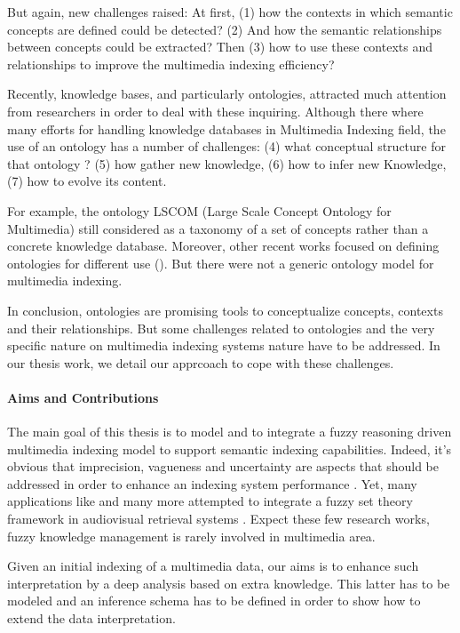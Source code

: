 	But again, new challenges raised: At first, (1) how the contexts in which semantic concepts are defined could be detected? (2) And how the semantic relationships between concepts could be extracted? Then (3) how to use these contexts and relationships to improve the multimedia indexing efficiency? 
	
	Recently, knowledge bases, and particularly ontologies, attracted much attention from researchers in order to deal with these inquiring. Although there where many efforts for handling knowledge databases in Multimedia Indexing field, the use of an ontology has a number of challenges: (4) what conceptual structure for that ontology ? (5) how gather new knowledge, (6) how to infer new Knowledge, (7) how to evolve its content.
	
	For example, the ontology LSCOM \cite{phd::Naphade2006} (Large Scale Concept Ontology for Multimedia) still considered as a taxonomy of a set of concepts rather than a concrete knowledge database. Moreover, other recent works focused on defining ontologies for different use  (\cite{phd::Karkaletsis2005,phd::Li2007, Zhai2008, phd::Mitschick2010a, phd::Kumar2012}). But there were not a generic ontology model for multimedia indexing.
	
	In conclusion, ontologies are promising tools to conceptualize concepts, contexts and their relationships. But some challenges related to ontologies and the very specific nature on multimedia indexing systems nature have to be addressed. In our thesis work, we detail our apprcoach to cope with these challenges.
	
	\paragraph{Aims and Contributions}
	The main goal of this thesis is to model and to integrate a fuzzy reasoning driven multimedia indexing model to support semantic indexing capabilities. Indeed, it's obvious that imprecision, vagueness and uncertainty are aspects that should be addressed in order to enhance an indexing  system performance \cite{Stoilos2005, phd::Zadeh2006}. Yet, many applications like  \cite{phd::Simou2008, phd::Elleuch2011, phd::Paliouras2011c} and many more attempted to integrate a fuzzy set theory framework in audiovisual retrieval systems \cite{phd::Zadeh1965, phd::Mendel1995, phd::Bede2013}. Expect these few research works, fuzzy knowledge management is rarely involved in multimedia area.

	Given an initial indexing of a multimedia data, our aims is to enhance such interpretation by a deep analysis based on extra knowledge. This latter has to be modeled and an inference schema has to be defined in order to show how to extend the data interpretation. 
	
